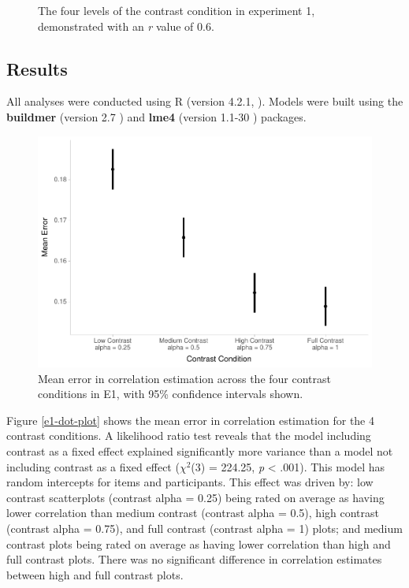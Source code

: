 \documentclass[preprint, 3p,
authoryear]{elsarticle} %
\begin{document}
\begin{figure}
\caption{\label{e1-example-plots}The four levels of the contrast condition in experiment 1, demonstrated with an \textit{r} value of 0.6.}\label{fig:e1-example-plots}
\end{figure}

\hypertarget{results}{%
\subsection{Results}\label{results}}

All analyses were conducted using R (version 4.2.1, \citep{r_core}).
Models were built using the \textbf{buildmer} (version 2.7
\citep{voeten_buildmer_2022}) and \textbf{lme4} (version 1.1-30
\citep{bates_lme4_2015}) packages.

\begin{figure}

\includegraphics[width=0.5\linewidth]{contrast_and_scatterplots_files/figure-latex/e1-dot-plot-1} \hfill{}

\caption{\label{e1-dot-plot}Mean error in correlation estimation across the four contrast conditions in E1, with 95\% confidence intervals shown.}\label{fig:e1-dot-plot}
\end{figure}

Figure \ref{e1-dot-plot} shows the mean error in correlation estimation
for the 4 contrast conditions. A likelihood ratio test reveals that the
model including contrast as a fixed effect explained significantly more
variance than a model not including contrast as a fixed effect
(\(\chi^2\)(3) = 224.25, \emph{p} \textless{} .001). This model has
random intercepts for items and participants. This effect was driven by:
low contrast scatterplots (contrast alpha = 0.25) being rated on average
as having lower correlation than medium contrast (contrast alpha = 0.5),
high contrast (contrast alpha = 0.75), and full contrast (contrast alpha
= 1) plots; and medium contrast plots being rated on average as having
lower correlation than high and full contrast plots. There was no
significant difference in correlation estimates between high and full
contrast plots.
\end{document}
